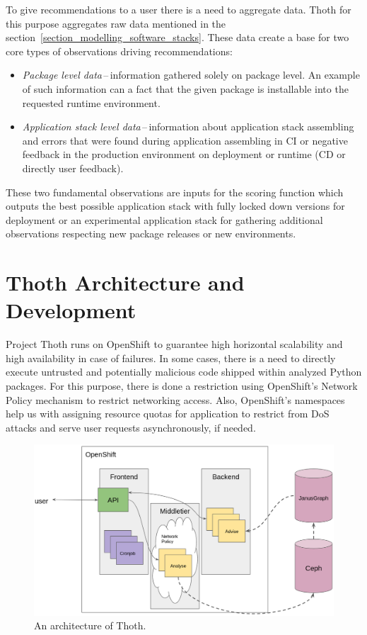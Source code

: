 \documentclass[a4paper]{llncs}
\begin{document}
To give recommendations to a user there is a need to aggregate data. Thoth for this purpose aggregates raw data mentioned in the section~\ref{section_modelling_software_stacks}. These data create a base for two core types of observations driving recommendations:

\begin{itemize}
  \item \emph{Package level data}\,--\,information gathered solely on package level. An example of such information can a fact that the given package is installable into the requested runtime environment.
  \item \emph{Application stack level data}\,--\,information about application stack assembling and errors that were found during application assembling in CI or negative feedback in the production environment on deployment or runtime (CD or directly user feedback).
\end{itemize}

These two fundamental observations are inputs for the scoring function which outputs the best possible application stack with fully locked down versions for deployment or an experimental application stack for gathering additional observations respecting new package releases or new environments.

\section{Thoth Architecture and Development}

Project Thoth runs on OpenShift to guarantee high horizontal scalability and high availability in case of failures. In some cases, there is a need to directly execute untrusted and potentially malicious code shipped within analyzed Python packages. For this purpose, there is done a restriction using OpenShift's Network Policy mechanism to restrict networking access. Also, OpenShift's namespaces help us with assigning resource quotas for application to restrict from DoS attacks and serve user requests asynchronously, if needed.

\begin{figure}[h!]
  \centering
  \includegraphics[width=1.0\textwidth]{fig/design.png}
  \caption{An architecture of Thoth.}
  \label{design}
\end{figure}
\end{document}

